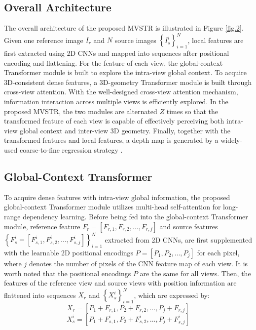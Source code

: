 \documentclass[10pt,twocolumn,letterpaper]{article}
\begin{document}
\subsection{Overall Architecture}
The overall architecture of the proposed MVSTR is illustrated in Figure \ref{fig.2}. Given one reference image $I_{r}$ and $N$ source images $\left\{I_{s}^{i}\right\}_{i=1}^{N}$, local features are first extracted using 2D CNNs and mapped into sequences after positional encoding and flattening. For the feature of each view, the global-context Transformer module is built to explore the intra-view global context. To acquire 3D-consistent dense features, a 3D-geometry Transformer module is built through cross-view attention. With the well-designed cross-view attention mechanism, information interaction across multiple views is efficiently explored. In the proposed MVSTR, the two modules are alternated $Z$ times so that the transformed feature of each view is capable of effectively perceiving both intra-view global context and inter-view 3D geometry. Finally, together with the transformed features and local features, a depth map is generated by a widely-used coarse-to-fine regression strategy \cite{casmvsnet}.

\subsection{Global-Context Transformer}

To acquire dense features with intra-view global information, the proposed global-context Transformer module utilizes multi-head self-attention for long-range dependency learning. Before being fed into the global-context Transformer module, reference feature $F_{r}=\left[F_{r, 1}, F_{r, 2}, \ldots, F_{r, j}\right]$ and source features $\left\{F_{s}^{i}=\left[F_{s, 1}^{i}, F_{s, 2}^{i}, \ldots, F_{s, j}^{i}\right]\right\}_{i=1}^{N}$ extracted from 2D CNNs, are first supplemented with the learnable 2D positional encodings $P=\left[P_{1}, P_{2}, \ldots, P_{j}\right]$ for each pixel, where $j$ denotes the number of pixels of the CNN feature map of each view. It is worth noted that the positional encodings $P$ are the same for all views. Then, the features of the reference view and source views with position information are flattened into sequences $X_{r}$ and $\left\{X_{s}^{i}\right\}_{i=1}^{N}$, which are expressed by:
\begin{equation}
X_{r}=\left[P_{1}+F_{r, 1}, P_{2}+F_{r, 2}, \ldots, P_{j}+F_{r, j}\right]
\label{eq.1}
\end{equation}
\begin{equation}
X_{s}^{i}=\left[P_{1}+F_{s, 1}^{i}, P_{2}+F_{s, 2}^{i}, \ldots, P_{j}+F_{s, j}^{i}\right]
\label{eq.2}
\end{equation}
\end{document}
